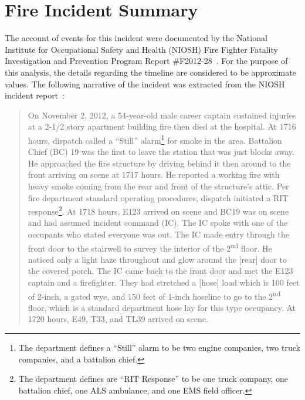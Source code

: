 \documentclass[12pt,oneside]{book}
\begin{document}
\chapter{Fire Incident Summary}
\label{fire_sum}
The account of events for this incident were documented by the National Institute for Occupational Safety and Health (NIOSH) Fire Fighter Fatality Investigation and Prevention Program Report \#F2012-28~\cite{NIOSH:Bowyer}. For the purpose of this analysis, the details regarding the timeline are considered to be approximate values. The following narrative of the incident was extracted from the NIOSH incident report~\cite{NIOSH:Bowyer}:
\begin{quote}
On November 2, 2012, a 54-year-old male career captain sustained injuries at a 2-1/2 story apartment building fire then died at the hospital. At 1716 hours, dispatch called a ``Still'' alarm\footnote{The department defines a ``Still'' alarm to be two engine companies, two truck companies, and a battalion chief.} for smoke in the area. Battalion Chief (BC) 19 was the first to leave the station that was just blocks away. He approached the fire structure by driving behind it then around to the front arriving on scene at 1717 hours. He reported a working fire with heavy smoke coming from the rear and front of the structure's attic. Per fire department standard operating procedures, dispatch initiated a RIT response\footnote{The department defines are ``RIT Response'' to be one truck company, one battalion chief, one ALS ambulance, and one EMS field officer.}. At 1718 hours, E123 arrived on scene and BC19 was on scene and had assumed incident command (IC). The IC spoke with one of the occupants who stated everyone was out. The IC made entry through the front door to the stairwell to survey the interior of the 2\textsuperscript{nd} floor. He noticed only a light haze throughout and glow around the [rear] door to the covered porch. The IC came back to the front door and met the E123 captain and a firefighter. They had stretched a [hose] load which is 100 feet of 2-inch, a gated wye, and 150 feet of 1-inch hoseline to go to the 2\textsuperscript{nd} floor, which is a standard department hose lay for this type occupancy. At 1720 hours, E49, T33, and TL39 arrived on scene.


\end{quote}
\end{document}
